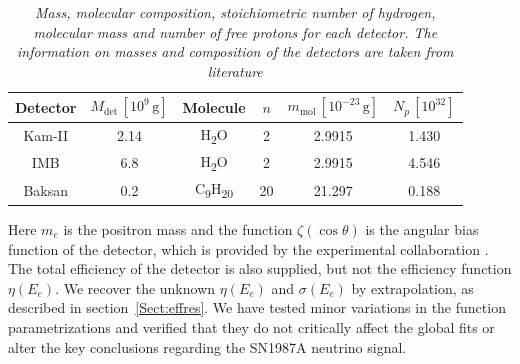 \documentclass[a4paper,11pt]{article}
\begin{document}
 \begin{table}[tb]%
\centering
\begin{tabular}{|c|c|c|c|c|c|}
\hline
\textbf{Detector} & \( M_{\text{det}} \, [10^9 \, \text{g}] \) & \textbf{Molecule} & \( n \) & \( m_{\text{mol}} \, [10^{-23} \, \text{g}] \) & \( N_p \, [10^{32}] \) \\ \hline
Kam-II            & 2.14                                    & H\textsubscript{2}O & 2       & 2.9915                              & 1.430                   \\ \hline

IMB              & 6.8                                     & H\textsubscript{2}O & 2       & 2.9915                              & 4.546                   \\ \hline

Baksan           & 0.2                                     & C\textsubscript{9}H\textsubscript{20} & 20 & 21.297                              & 0.188                   \\ \hline
\end{tabular}
\caption{\emph{Mass, molecular composition, stoichiometric number of hydrogen, molecular mass and number of free protons for each detector. The information on masses and composition of the detectors are taken from literature \cite{hirataPhysRevLett.58.1490, CASPER1988463, ALEXEYEV1988209}}}
\label{tab:protons}
\end{table}
Here  $m_e$ is the positron mass and the function $\zeta(\cos{\theta})$ is the angular bias function of the detector, which is provided by the experimental collaboration \cite{hirataPhysRevLett.58.1490,PhysRevD.38.448,PhysRevLett.58.1494,PhysRevD.37.3361,ALEXEYEV1988209}. 
 The total efficiency of the detector is also supplied, but not the efficiency function $\eta(E_e)$. 
 We recover the unknown $\eta(E_e)$ and  $\sigma(E_e)$ by extrapolation,
as described in
section~\ref{Sect:effres}.
%
We have tested minor variations in  the function parametrizations and verified that they do not critically affect the global fits or alter the key conclusions regarding the SN1987A neutrino signal.
\end{document}

